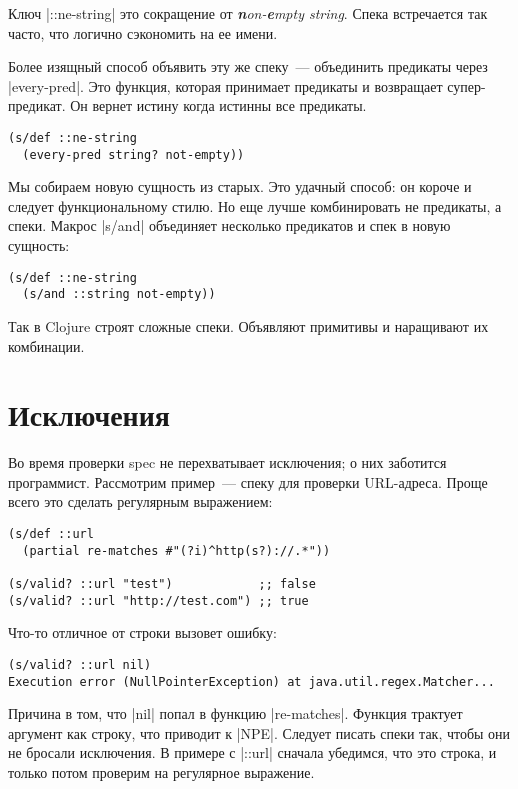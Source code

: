 Ключ \spverb|::ne-string| это сокращение от \emph{\textbf{n}on-\textbf{e}mpty string}.
Спека встречается так часто, что логично сэкономить на ее имени.

Более изящный способ объявить эту же спеку~--- объединить предикаты через
\spverb|every-pred|. Это функция, которая принимает предикаты и возвращает
супер-предикат. Он вернет истину когда истинны все предикаты.

\begin{verbatim}
(s/def ::ne-string
  (every-pred string? not-empty))
\end{verbatim}

Мы собираем новую сущность из старых. Это удачный способ: он короче и следует
функциональному стилю. Но еще лучше комбинировать не предикаты, а спеки. Макрос
\spverb|s/and| объединяет несколько предикатов и спек в новую сущность:

\begin{verbatim}
(s/def ::ne-string
  (s/and ::string not-empty))
\end{verbatim}

Так в Clojure строят сложные спеки. Объявляют примитивы и наращивают их
комбинации.

\section{Исключения}

Во время проверки spec не перехватывает исключения; о них заботится
программист. Рассмотрим пример~--- спеку для проверки URL-адреса. Проще всего
это сделать регулярным выражением:

\begin{verbatim}
(s/def ::url
  (partial re-matches #"(?i)^http(s?)://.*"))

(s/valid? ::url "test")            ;; false
(s/valid? ::url "http://test.com") ;; true
\end{verbatim}

\noindent
Что-то отличное от строки вызовет ошибку:

\begin{verbatim}
(s/valid? ::url nil)
Execution error (NullPointerException) at java.util.regex.Matcher...
\end{verbatim}

Причина в том, что \spverb|nil| попал в функцию \spverb|re-matches|. Функция
трактует аргумент как строку, что приводит к \spverb|NPE|. Следует писать спеки
так, чтобы они не бросали исключения. В примере с \spverb|::url| сначала
убедимся, что это строка, и только потом проверим на регулярное выражение.

